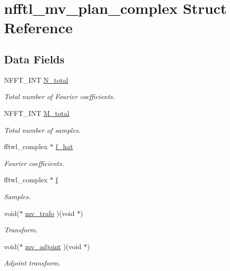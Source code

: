 \hypertarget{structnfftl__mv__plan__complex}{\section{nfftl\-\_\-mv\-\_\-plan\-\_\-complex Struct Reference}
\label{structnfftl__mv__plan__complex}
}
\subsection*{Data Fields}
\begin{DoxyCompactItemize}
\item 
N\-F\-F\-T\-\_\-\-I\-N\-T \hyperlink{structnfftl__mv__plan__complex_a3e5765ac3a11fd4b8d83805674a6bef3}{N\-\_\-total}
\begin{DoxyCompactList}\small\item\em Total number of Fourier coefficients. \end{DoxyCompactList}\item 
N\-F\-F\-T\-\_\-\-I\-N\-T \hyperlink{structnfftl__mv__plan__complex_a40cb228daa088391a60bb3a1bda8e431}{M\-\_\-total}
\begin{DoxyCompactList}\small\item\em Total number of samples. \end{DoxyCompactList}\item 
fftwl\-\_\-complex $\ast$ \hyperlink{structnfftl__mv__plan__complex_ae4b3786df2416012cf16d7ed4c097791}{f\-\_\-hat}
\begin{DoxyCompactList}\small\item\em Fourier coefficients. \end{DoxyCompactList}\item 
fftwl\-\_\-complex $\ast$ \hyperlink{structnfftl__mv__plan__complex_adb5c2e9ba052f02fec78e550413aacfa}{f}
\begin{DoxyCompactList}\small\item\em Samples. \end{DoxyCompactList}\item 
void($\ast$ \hyperlink{structnfftl__mv__plan__complex_a4d573c341aae7a4e034944772478658c}{mv\-\_\-trafo} )(void $\ast$)
\begin{DoxyCompactList}\small\item\em Transform. \end{DoxyCompactList}\item 
void($\ast$ \hyperlink{structnfftl__mv__plan__complex_a5f31b4b9a03ac8f9a503c1ae42cad758}{mv\-\_\-adjoint} )(void $\ast$)
\begin{DoxyCompactList}\small\item\em Adjoint transform. \end{DoxyCompactList}\end{DoxyCompactItemize}


